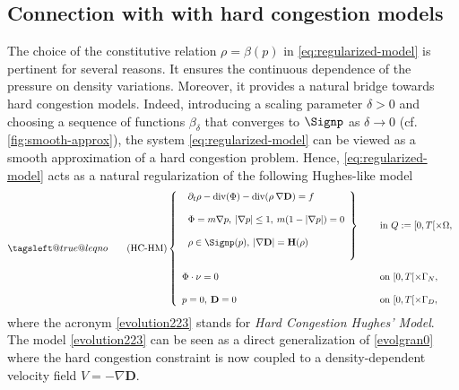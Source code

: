 \documentclass[final,reqno]{amsart}
\makeatletter
\theoremstyle{plain}
\theoremstyle{definition}
\theoremstyle{remark}
\numberwithin{remark}{section}	%
\numberwithin{example}{section}	%
\DeclareMathOperator{\dive}{div}
\newcommand{\de}{\mathbf{D}}
\newcommand{\he}{\mathbf{H}}
\newcommand{\cf}{cf.\xspace}	%
\newcommand{\leqnomode}{\tagsleft@true\let\veqno\@@leqno}
\makeatother
\begin{document}
\subsection{Connection with with hard congestion models}\label{sec:p-model}
The choice of the constitutive relation $\rho = \beta(p)$ in \eqref{eq:regularized-model} is pertinent for several reasons. It ensures the continuous dependence of the pressure on density variations. Moreover, it provides a natural bridge towards hard congestion models. Indeed, introducing a scaling parameter $\delta >0$ and choosing a sequence of functions $\beta_\delta$ that converges to $\Signp$ as $\delta\to 0$ (\cf \cref{fig:smooth-approx}),  the system \eqref{eq:regularized-model} can be viewed as a smooth approximation of a hard congestion problem. Hence, \eqref{eq:regularized-model} acts as a natural regularization of the following Hughes-like model 
\begin{equation*}\leqnomode\tag{HC-HM}
\label{evolution223}
	\left\{
	\begin{array}{ll}
		\left. 	\begin{array}{l}
			\partial_t \rho -\dive (\Phi) -\dive(\rho \:  \nabla \de)= f  \\   \\
			\Phi=m \nabla p,  \: \vert \nabla p\vert \leq 1,\:  m(1-\vert \nabla p\vert)=0\\   \\
			\rho \in  \Signp(p),\:  \vert \nabla \de \vert=\he(\rho) \\ \\
		\end{array} \right\}  \quad & \hbox{ in } Q:=[0,T[ \times \Omega,\\  \\
		\Phi \cdot \nu =0 & \hbox{ on }[0,T[ \times\Gamma_N,  \\  \\
		p=0, \:	\de =0    & \hbox{ on }[0,T[ \times\Gamma_D,
	\end{array}
	\right.
\end{equation*}
where the acronym \eqref{evolution223} stands for \emph{Hard Congestion Hughes' Model}. The model \eqref{evolution223} can be seen as a direct generalization of \eqref{evolgran0} where the hard congestion constraint is now coupled to a density-dependent velocity field $V=-\nabla\de$.
\end{document}
